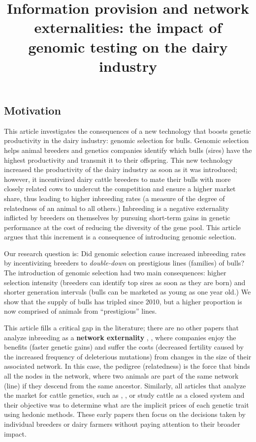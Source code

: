\documentclass[12pt,letterpaper]{article}
\title{Information provision and network externalities: the impact of genomic testing on the dairy industry}
\author{}
\date{} %
\begin{document}
\maketitle

\subsection*{Motivation}

This article investigates the consequences of a new technology that boosts genetic productivity in the dairy industry: genomic selection for bulls. Genomic selection helps animal breeders and genetics companies identify which bulls (sires) have the highest productivity and transmit it to their offspring. This new technology increased the productivity of the dairy industry as soon as it was introduced; however, it incentivized dairy cattle breeders to mate their bulls with more closely related cows to undercut the competition and ensure a higher market share, thus leading to higher inbreeding rates (a measure of the degree of relatedness of an animal to all others.)  Inbreeding is a negative externality inflicted by breeders on themselves by pursuing short-term gains in genetic performance at the cost of reducing the diversity of the gene pool. This article argues that this increment is a consequence of introducing genomic selection.

Our research question is: Did genomic selection cause increased inbreeding rates by incentivizing breeders to \emph{double-down} on prestigious lines (families) of bulls? The introduction of genomic selection had two main consequences: higher selection intensity (breeders can identify top sires as soon as they are born) and shorter generation intervals (bulls can be marketed as young as one year old.) We show that the supply of bulls has tripled since 2010, but a higher proportion is now comprised of animals from ``prestigious'' lines. 

This article fills a critical gap in the literature; there are no other papers that analyze inbreeding as a \textbf{network externality} \citep{Liebowitz1994}, \citep{Katz1985}, where companies enjoy the benefits (faster genetic gains) and suffer the costs (decreased fertility caused by the increased frequency of deleterious mutations) from changes in the size of their associated network. In this case, the pedigree (relatedness) is the force that binds all the nodes in the network, where two animals are part of the same network (line) if they descend from the same ancestor. Similarly, all articles that analyze the market for cattle genetics, such as \cite{Kerr1984}, \cite{Melton1994}, \cite{Richards1996} or \cite{Schroeder1992} study cattle as a closed system and their objective was to determine what are the implicit prices of each genetic trait using hedonic methods. These early papers then focus on the decisions taken by individual breeders or dairy farmers without paying attention to their broader impact.
\end{document}
